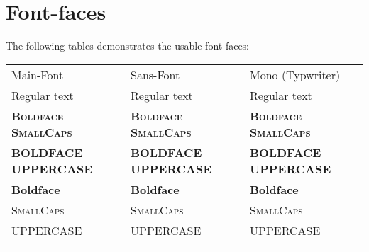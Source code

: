 \documentclass[%
   final,      %
   paper=a4,%
   paper=portrait, %
   pagesize=auto, %
   fontsize=11pt,%
   version=last, %
   english, %
 ]{scrbook} %
\begin{document}
\section*{Font-faces}
The following tables demonstrates the usable font-faces:

\begin{table}[H]
	\tablestyle[sansbold]
	\normalsize
	\renewcommand{\arraystretch}{1.4} %
	\begin{tabular}{lll}
		\theadstart
		\thead Main-Font &
		\thead Sans-Font  &
		\thead Mono (Typwriter) \\
		\tbody
		\rmfamily Regular text	&
		\sffamily Regular text	&
		\ttfamily Regular text \\
		\rmfamily \bfseries\scshape Boldface SmallCaps	&
		\sffamily \bfseries\scshape Boldface SmallCaps	&
		\ttfamily \bfseries\scshape Boldface SmallCaps	\\
		\rmfamily \bfseries\uppercase{Boldface Uppercase}	&
		\sffamily \bfseries\uppercase{Boldface Uppercase}	&
		\ttfamily \bfseries\uppercase{Boldface Uppercase}	\\
		\rmfamily \bfseries Boldface						&
		\sffamily \bfseries Boldface						&
		\ttfamily \bfseries Boldface						\\
		\rmfamily \scshape SmallCaps						&
		\sffamily \scshape SmallCaps						&
		\ttfamily \scshape SmallCaps						\\
		\rmfamily \uppercase{Uppercase} &
		\sffamily \uppercase{Uppercase} &
		\ttfamily \uppercase{Uppercase} \\
		\tend
	\end{tabular}
\end{table}		
\end{document}
